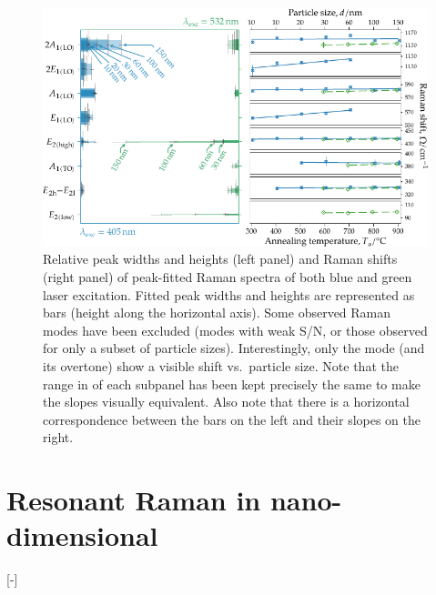 \documentclass[draft,webedition,openright,titles,swedish,english]{LuaUUThesis}\usepackage[]{graphicx}\usepackage[]{xcolor}
\newenvironment{knitrout}{}{} %
\newcommand{\vs}{vs.}
\begin{document}
\begin{figure}[tbp]
\centering
\begin{knitrout}\scriptsize
{}\color{fgcolor}

{\centering \includegraphics[width=4.72in]{figure/0525P-fig-bluegreen-bars_shifts-1} 

}


\end{knitrout}
\caption[Fitted peak parameters of non-resonant Raman spectra]{%
   Relative peak widths and heights (left panel) and Raman shifts (right panel) of peak-fitted
   Raman spectra of both blue and green laser excitation.
   Fitted peak widths and heights are represented as bars (height along the horizontal axis).
   Some observed Raman modes have been excluded (modes with weak S/N, or those
   observed for only a subset of particle sizes).
   Interestingly, only the  mode (and its overtone) show a visible shift
   \vs\ particle size.
   Note that the range in  of each subpanel has been kept precisely
   the same to make the slopes visually equivalent.
   Also note that there is a horizontal correspondence between the bars on the left
   and their slopes on the right.}
\label{fig:P25-bluegreenraman-bars+shifts}
\end{figure}



% 

\section[Resonant Raman in nano-dimensional ZnO]{Resonant Raman in nano-dimensional \ZnO}
\label{results:P25-resonant-Raman}
[-\baselineskip]
\end{document}
